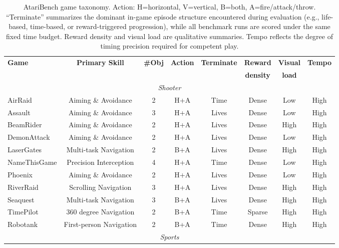 \begin{table}[ht]
\centering
\small
\caption{AtariBench game taxonomy. Action: H=horizontal, V=vertical, B=both, A=fire/attack/throw. ``Terminate'' summarizes the dominant in-game episode structure encountered during evaluation (e.g., life-based, time-based, or reward-triggered progression), while all benchmark runs are scored under the same fixed time budget. Reward density and visual load are qualitative summaries. Tempo reflects the degree of timing precision required for competent play.}
\label{tab:game_choice}
\begin{tabular}{lccccccc}
\toprule
\textbf{Game}  & \textbf{Primary Skill} & \textbf{\#Obj} & \textbf{Action} & \textbf{Terminate} & \textbf{Reward} & \textbf{Visual} & \textbf{Tempo} \\
 &  &  &  &  & \textbf{density} & \textbf{load} &  \\
\midrule
\multicolumn{8}{c}{\it Shooter} \\
\midrule
AirRaid                & Aiming \& Avoidance         & 2 & H{+}A & Time    & Dense  & Low  & High \\
Assault                & Aiming \& Avoidance         & 3 & H{+}A & Lives   & Dense  & Low  & High \\
BeamRider              & Aiming \& Avoidance         & 2 & H{+}A & Lives   & Dense  & High & High \\
DemonAttack            & Aiming \& Avoidance         & 2 & H{+}A & Lives   & Dense  & Low  & High \\
LaserGates             & Multi-task Navigation       & 2 & B{+}A & Lives   & Dense  & High & High \\
NameThisGame           & Precision Interception      & 4 & H{+}A & Time    & Dense  & Low  & High \\
Phoenix                & Aiming \& Avoidance         & 2 & H{+}A & Lives   & Dense  & Low  & High \\
RiverRaid              & Scrolling Navigation        & 3 & H{+}A & Lives   & Dense  & High & High \\
Seaquest               & Multi-task Navigation       & 3 & B{+}A & Lives   & Dense  & High & High \\
TimePilot              & 360 degree Navigation       & 2 & B{+}A & Time    & Sparse & High & High \\
Robotank               & First-person Navigation     & 2 & B{+}A & Time    & Dense  & High & High \\
\midrule
\multicolumn{8}{c}{\it Sports} \\

\end{tabular}
\end{table}
